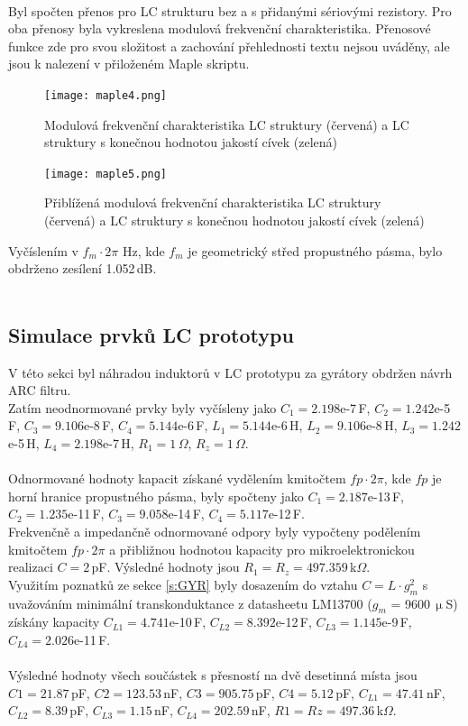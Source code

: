 \\
\noindent Byl spočten přenos pro LC strukturu bez a s přidanými sériovými rezistory. Pro oba přenosy byla vykreslena modulová frekvenční charakteristika. Přenosové funkce zde pro svou složitost a zachování přehlednosti textu nejsou uváděny, ale jsou k nalezení v přiloženém Maple skriptu.
\begin{figure}[h]
\centering
\texttt{[image: maple4.png]}
\caption[Modulová frekvenční charakteristika LC struktury a LC struktury s konečnou hodnotou jakostí cívek]{Modulová frekvenční charakteristika LC struktury (červená) a LC struktury s konečnou hodnotou jakostí cívek (zelená)}
\end{figure}
\begin{figure}[h]
\centering
\texttt{[image: maple5.png]}
\caption[Přiblížená modulová frekvenční charakteristika LC struktury a LC struktury s konečnou hodnotou jakostí cívek]{Přiblížená modulová frekvenční charakteristika LC struktury (červená) a LC struktury s konečnou hodnotou jakostí cívek (zelená)}
\end{figure}
\noindent Vyčíslením v $f_m \cdot 2 \pi$ Hz, kde $f_m$ je geometrický střed propustného pásma, bylo obdrženo zesílení 1.052\,dB.\\
\\
\subsection{Simulace prvků LC prototypu}\label{s:ARC123}
V této sekci byl náhradou induktorů v LC prototypu za gyrátory obdržen návrh ARC filtru.\\
Zatím neodnormované prvky byly vyčísleny jako $C_1 = 2.198$e-7\,F, $C_2 = 1.242$e-5\,F, $C_3 = 9.106$e-8\,F, $C_4 = 5.144$e-6\,F, $L_1 = 5.144$e-6\,H, $L_2 = 9.106$e-8\,H, $L_3 = 1.242$e-5\,H, $L_4 = 2.198$e-7\,H, $R_1 = 1$\,$\Omega$, $R_z = 1$\,$\Omega$.\\
\\
\noindent Odnormované hodnoty kapacit získané vydělením kmitočtem $fp \cdot 2 \pi$, kde $fp$ je horní hranice propustného pásma, byly spočteny jako $C_1 = 2.187$e-13\,F, $C_2 = 1.235$e-11\,F, $C_3 = 9.058$e-14\,F, $C_4 = 5.117$e-12\,F.\\
\noindent Frekvenčně a impedančně odnormované odpory byly vypočteny podělením kmitočtem $fp \cdot 2 \pi$ a přibližnou hodnotou kapacity pro mikroelektronickou realizaci $C = 2$\,pF. Výsledné hodnoty jsou $R_1 = R_z = 497.359$\,k$\Omega$.\\
\noindent Využitím poznatků ze sekce \ref{s:GYR} byly dosazením do vztahu $C = L \cdot g_m^2$ s uvažováním minimální transkonduktance z datasheetu LM13700 ($g_m$ = 9600\,$\upmu$S) získány kapacity $C_{L1} = 4.741$e-10\,F, $C_{L2} = 8.392$e-12\,F, $C_{L3} = 1.145$e-9\,F, $C_{L4} = 2.026$e-11\,F.\\
\\
\noindent Výsledné hodnoty všech součástek s přesností na dvě desetinná místa jsou\\ $C1 = 21.87$\,pF, $C2 = 123.53$\,nF, $C3 = 905.75$\,pF, $C4 = 5.12$\,pF, $C_{L1} = 47.41$\,nF, $C_{L2} = 8.39$\,pF, $C_{L3} = 1.15$\,nF, $C_{L4} = 202.59$\,nF, $R1 = Rz = 497.36$\,k$\Omega$.

